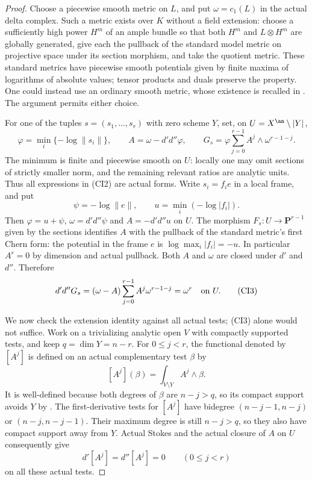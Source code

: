 \begin{proof}
Choose a piecewise smooth metric on $L$, and put
$\omega=c_1(L)$ in the actual delta complex.  Such a metric exists
over $K$ without a field extension: choose a sufficiently high power
$H^m$ of an ample bundle so that both $H^m$ and $L\otimes H^m$ are
globally generated, give each the pullback of the standard model
metric on projective space under its section morphism, and take the
quotient metric.  These standard metrics have piecewise smooth
potentials given by finite maxima of logarithms of absolute values;
tensor products and duals preserve the property.  One could instead
use an ordinary smooth metric, whose existence is recalled in
\cite[Section 5.1]{Mih24}.  The argument permits either choice.

For one of the tuples $s=(s_1,\ldots,s_r)$ with zero scheme $Y$, set,
on $U=X^{\an}\setminus|Y|$,
\[
 \varphi=\min_i\{-\log\|s_i\|\},\qquad
 A=\omega-d'd''\varphi,\qquad
 G_s=\varphi\sum_{j=0}^{r-1} A^j\wedge\omega^{r-1-j}.
                                                        \tag{CI2}
\]
The minimum is finite and piecewise smooth on $U$: locally one may
omit sections of strictly smaller norm, and the remaining relevant
ratios are analytic units.  Thus all expressions in (CI2) are actual
forms.  Write $s_i=f_i e$ in a local frame, and put
\[
          \psi=-\log\|e\|,\qquad
          u=\min_i(-\log|f_i|).
\]
Then $\varphi=u+\psi$, $\omega=d'd''\psi$ and $A=-d'd''u$ on $U$.
The morphism $F_s:U\to\mathbf P^{r-1}$ given by the sections identifies
$A$ with the pullback of the standard metric's first Chern form:
the potential in the frame $e$ is $\log\max_i|f_i|=-u$.
In particular $A^r=0$ by dimension and actual pullback.  Both $A$
and $\omega$ are closed under $d'$ and $d''$.  Therefore
\[
 d'd''G_s=(\omega-A)\sum_{j=0}^{r-1}A^j\omega^{r-1-j}
                              =\omega^r\quad\hbox{on }U.       \tag{CI3}
\]

We now check the extension identity against all actual tests; (CI3)
alone would not suffice.  Work on a trivializing analytic open $V$
with compactly supported tests, and keep $q=\dim Y=n-r$.
For $0\le j<r$, the functional denoted by $[A^j]$ is defined on an
actual complementary test $\beta$ by
\[
                 [A^j](\beta)=\int_{V\setminus Y}A^j\wedge\beta.
\]
It is well-defined because both degrees of $\beta$ are $n-j>q$,
so its compact support avoids $Y$ by \cite[Corollary 4.9]{Mih24}.
The first-derivative tests for $[A^j]$ have bidegree
$(n-j-1,n-j)$ or $(n-j,n-j-1)$.  Their maximum degree is still
$n-j>q$, so they also have compact support away from $Y$.
Actual Stokes and the actual closure of $A$ on $U$ consequently give
\[
                         d'[A^j]=d''[A^j]=0
                         \qquad(0\le j<r)              \tag{CI4}
\]
on all these actual tests.


\end{proof}
